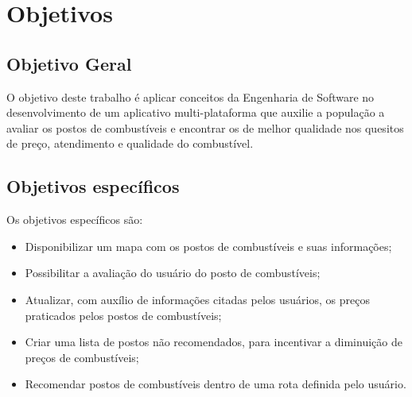 \section{Objetivos}

\subsection{Objetivo Geral}

O objetivo deste trabalho é aplicar conceitos da Engenharia de Software no desenvolvimento de um aplicativo multi-plataforma que auxilie a população a avaliar os postos de combustíveis e encontrar os de melhor qualidade nos quesitos de preço, atendimento e qualidade do combustível.

\subsection{Objetivos específicos}

Os objetivos específicos são:
\begin{itemize}
    \item Disponibilizar um mapa com os postos de combustíveis e suas informações;
    \item Possibilitar a avaliação do usuário do posto de combustíveis;
    \item Atualizar, com auxílio de informações citadas pelos usuários, os preços praticados pelos postos de combustíveis;
    \item Criar uma lista de postos não recomendados, para incentivar a diminuição de preços de combustíveis;
    \item Recomendar postos de combustíveis dentro de uma rota definida pelo usuário.
\end{itemize}
